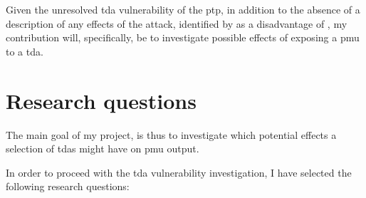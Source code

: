 Given the unresolved \acrshort{tda} vulnerability of the \acrshort{ptp}, in addition to the absence of a description of any effects of the attack, identified by \cite{moussa2016security} as a disadvantage of \cite{ullmann2009delay}, my contribution will, specifically, be to investigate possible effects of exposing a \acrlong{pmu} to a \acrlong{tda}. 
%    
\section{Research questions}
The main goal of my project, is thus to investigate which potential effects a selection of \acrlong{tda}s might have on \acrshort{pmu} output. 

In order to proceed with the \acrlong{tda} vulnerability investigation, I have selected the following research questions:

